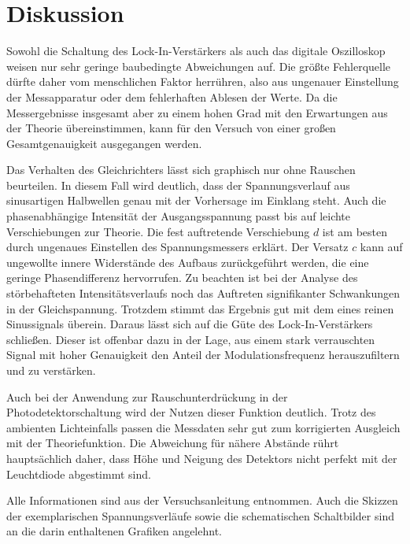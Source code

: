 
\vfill

\section{Diskussion}
\label{sec:diskussion}

Sowohl die Schaltung des Lock-In\hspace{0.1ex}-\hspace{-0.25ex}Verstärkers als auch das digitale Oszilloskop
weisen nur sehr geringe baubedingte Abweichungen auf. Die größte Fehlerquelle dürfte daher vom menschlichen
Faktor herrühren, also aus ungenauer Einstellung der Messapparatur oder dem fehlerhaften Ablesen der Werte.
Da die Messergebnisse insgesamt aber zu einem hohen Grad mit den Erwartungen aus der Theorie übereinstimmen,
kann für den Versuch von einer großen Gesamtgenauigkeit ausgegangen werden. 

\newpage

Das Verhalten des Gleichrichters lässt sich graphisch nur ohne Rauschen beurteilen.
In diesem Fall wird deutlich, dass der Spannungsverlauf aus sinusartigen Halbwellen genau mit
der Vorhersage im Einklang steht. Auch die phasenabhängige Intensität der Ausgangsspannung passt bis auf leichte
Verschiebungen zur Theorie. Die fest auftretende Verschiebung $d$ ist am besten durch ungenaues Einstellen
des Spannungsmessers erklärt. Der Versatz $c$ kann auf ungewollte innere Widerstände
des Aufbaus zurückgeführt werden, die eine geringe Phasendifferenz hervorrufen. Zu beachten ist bei der
Analyse des störbehafteten Intensitätsverlaufs noch das Auftreten signifikanter Schwankungen in der
Gleichspannung. Trotzdem stimmt das Ergebnis gut mit dem eines reinen Sinussignals überein. Daraus
lässt sich auf die Güte des Lock-In\hspace{0.1ex}-\hspace{-0.25ex}Verstärkers schließen. Dieser ist offenbar
dazu in der Lage, aus einem stark verrauschten Signal mit hoher Genauigkeit den Anteil der Modulationsfrequenz
herauszufiltern und zu verstärken.

Auch bei der Anwendung zur Rauschunterdrückung in der Photodetektorschaltung wird der Nutzen dieser
Funktion deutlich. Trotz des ambienten Lichteinfalls passen die Messdaten sehr gut zum
korrigierten Ausgleich mit der Theoriefunktion. Die Abweichung für nähere Abstände rührt hauptsächlich
daher, dass Höhe und Neigung des Detektors nicht perfekt mit der Leuchtdiode abgestimmt sind. 

\vfill

Alle Informationen sind aus der Versuchsanleitung \cite{lock-in} entnommen. Auch die Skizzen
der exemplarischen Spannungsverläufe sowie die schematischen Schaltbilder sind an die darin enthaltenen
Grafiken angelehnt.

\vfill
\vfill
\vfill
\vfill
\vfill
\vfill
\vfill
